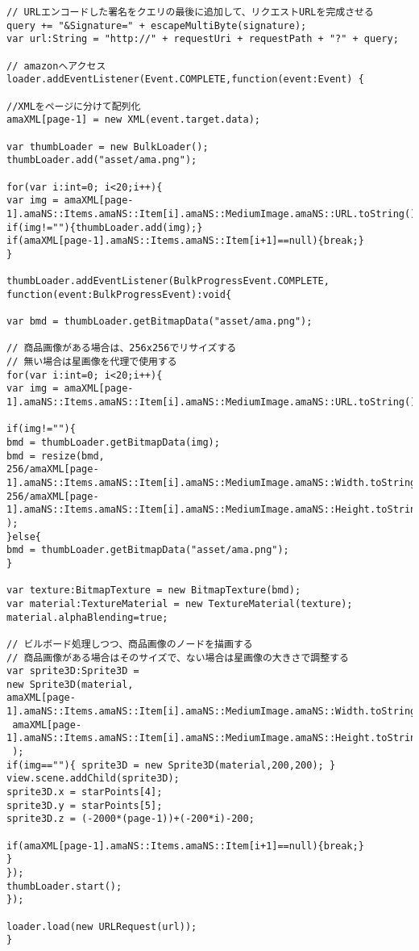 {\begin{verbatim}
// URLエンコードした署名をクエリの最後に追加して、リクエストURLを完成させる
query += "&Signature=" + escapeMultiByte(signature);
var url:String = "http://" + requestUri + requestPath + "?" + query;

// amazonへアクセス
loader.addEventListener(Event.COMPLETE,function(event:Event) {

//XMLをページに分けて配列化
amaXML[page-1] = new XML(event.target.data);

var thumbLoader = new BulkLoader();
thumbLoader.add("asset/ama.png");

for(var i:int=0; i<20;i++){
var img = amaXML[page-1].amaNS::Items.amaNS::Item[i].amaNS::MediumImage.amaNS::URL.toString();
if(img!=""){thumbLoader.add(img);}
if(amaXML[page-1].amaNS::Items.amaNS::Item[i+1]==null){break;}
}

thumbLoader.addEventListener(BulkProgressEvent.COMPLETE, function(event:BulkProgressEvent):void{

var bmd = thumbLoader.getBitmapData("asset/ama.png");

// 商品画像がある場合は、256x256でリサイズする
// 無い場合は星画像を代理で使用する
for(var i:int=0; i<20;i++){
var img = amaXML[page-1].amaNS::Items.amaNS::Item[i].amaNS::MediumImage.amaNS::URL.toString();

if(img!=""){
bmd = thumbLoader.getBitmapData(img);
bmd = resize(bmd,
256/amaXML[page-1].amaNS::Items.amaNS::Item[i].amaNS::MediumImage.amaNS::Width.toString(),
256/amaXML[page-1].amaNS::Items.amaNS::Item[i].amaNS::MediumImage.amaNS::Height.toString()
);
}else{
bmd = thumbLoader.getBitmapData("asset/ama.png");
}

var texture:BitmapTexture = new BitmapTexture(bmd);
var material:TextureMaterial = new TextureMaterial(texture);
material.alphaBlending=true;

// ビルボード処理しつつ、商品画像のノードを描画する
// 商品画像がある場合はそのサイズで、ない場合は星画像の大きさで調整する
var sprite3D:Sprite3D = 
new Sprite3D(material,
amaXML[page-1].amaNS::Items.amaNS::Item[i].amaNS::MediumImage.amaNS::Width.toString(),
 amaXML[page-1].amaNS::Items.amaNS::Item[i].amaNS::MediumImage.amaNS::Height.toString()
 );
if(img==""){ sprite3D = new Sprite3D(material,200,200); }
view.scene.addChild(sprite3D);
sprite3D.x = starPoints[4];
sprite3D.y = starPoints[5];
sprite3D.z = (-2000*(page-1))+(-200*i)-200;

if(amaXML[page-1].amaNS::Items.amaNS::Item[i+1]==null){break;}
}
});
thumbLoader.start();
});

loader.load(new URLRequest(url));
}


\end{verbatim}}
